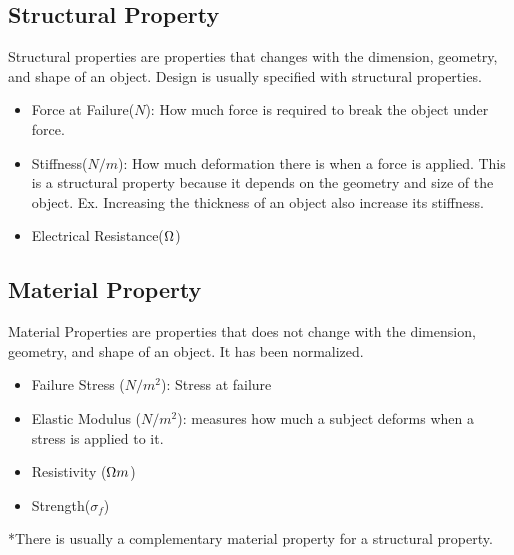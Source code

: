\documentclass{article}
\begin{document}
    \subsection*{Structural Property}
        Structural properties are properties that changes with the dimension, geometry, and shape of an object. Design is usually specified with structural properties.
        \begin{itemize}
            \item Force at Failure($N$): How much force is required to break the object under force.
            \item Stiffness($N/m$): How much deformation there is when a force is applied. This is a structural property
                                    because it depends on the geometry and size of the object. Ex. Increasing 
                                    the thickness of an object also increase its stiffness.
            \item Electrical Resistance($\ohm$)
        \end{itemize}

    \subsection*{Material Property}
        Material Properties are properties that does not change with the dimension, geometry, and shape of an object.
        It has been normalized.
        \begin{itemize}
            \item Failure Stress ($N/m^{2}$): Stress at failure
            \item Elastic Modulus ($N/m^{2}$): measures how much a subject deforms when a stress is applied to it.
            \item Resistivity ($\ohm m$)
            \item Strength($\sigma_{f}$)
        \end{itemize}

    *There is usually a complementary material property for a structural property.
\end{document}
